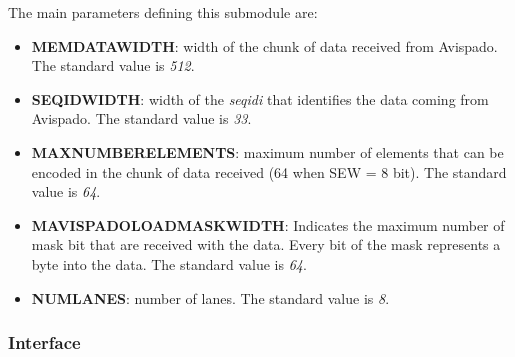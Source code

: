 \bigskip

The main parameters defining this submodule are:
\begin{itemize}
    \item \textbf{MEM\+DATA\+WIDTH}: width of the chunk of data received from Avispado. The standard value is \textit{512}.
    
    \item \textbf{SEQ\+ID\+WIDTH}: width of the \textit{seq\+id\+i} that identifies the data coming from Avispado. The standard value is \textit{33}.
    
    \item \textbf{MAX\+NUMBER\+ELEMENTS}: maximum number of elements that can be encoded in the chunk of data received (64 when SEW = 8 bit). The standard value is \textit{64}.
    
    \item \textbf{MAVISPADO\+LOAD\+MASK\+WIDTH}: Indicates the maximum number of mask bit that are received with the data. Every bit of the mask represents a byte into the data. The standard value is \textit{64}.
    
    \item \textbf{NUM\+LANES}: number of lanes. The standard value is \textit{8}.
\end{itemize}

\subsubsection{Interface}

